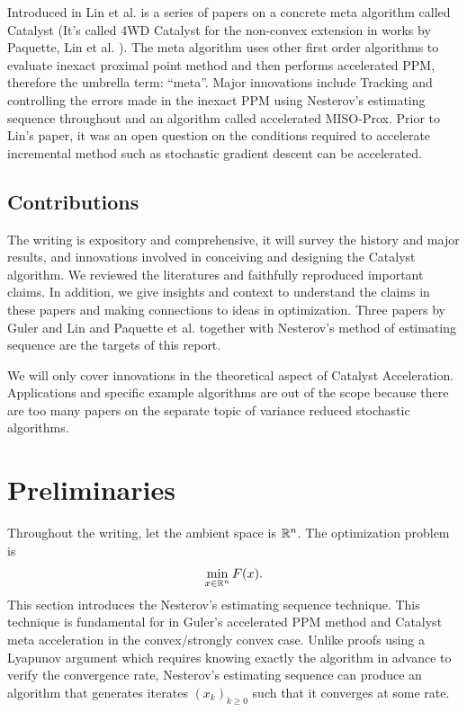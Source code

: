 \documentclass[12pt]{article}
\begin{document}
    Introduced in Lin et al. \cite{lin_universal_2015,lin_catalyst_2018} is a series of papers on a concrete meta algorithm called Catalyst (It's called 4WD Catalyst for the non-convex extension in works by Paquette, Lin et al. \cite{paquette_catalyst_2018}). 
    The meta algorithm uses other first order algorithms to evaluate inexact proximal point method and then performs accelerated PPM, therefore the umbrella term: ``meta''. 
    Major innovations include Tracking and controlling the errors made in the inexact PPM using Nesterov's estimating sequence throughout and an algorithm called accelerated MISO-Prox.  
    Prior to Lin's paper, it was an open question on the conditions required to accelerate incremental method such as stochastic gradient descent can be accelerated. 

    \subsection{Contributions}
        The writing is expository and comprehensive, it will survey the history and major results, and innovations involved in conceiving and designing the Catalyst algorithm. 
        We reviewed the literatures and faithfully reproduced important claims.
        In addition, we give insights and context to understand the claims in these papers and making connections to ideas in optimization. 
        Three papers by Guler \cite{guler_new_1992} and Lin \cite{lin_universal_2015} and Paquette et al. \cite{lin_catalyst_2018} together with Nesterov's \cite{nesterov_lectures_2018} method of estimating sequence are the targets of this report. 

        We will only cover innovations in the theoretical aspect of Catalyst Acceleration. 
        Applications and specific example algorithms are out of the scope because there are too many papers on the separate topic of variance reduced stochastic algorithms. 

\section{Preliminaries}\label{sec:preliminaries}
    Throughout the writing, let the ambient space is $\mathbb R^n$. 
    The optimization problem is
    \begin{align*}
        \min_{x \in \mathbb R^n} F(x). 
    \end{align*}
    This section introduces the Nesterov's estimating sequence technique. 
    This technique is fundamental for in Guler's accelerated PPM method and Catalyst meta acceleration in the convex/strongly convex case. 
    Unlike proofs using a Lyapunov argument which requires knowing exactly the algorithm in advance to verify the convergence rate, Nesterov's estimating sequence can produce an algorithm that generates iterates $(x_k)_{k \ge0}$ such that it converges at some rate. 
\end{document}
